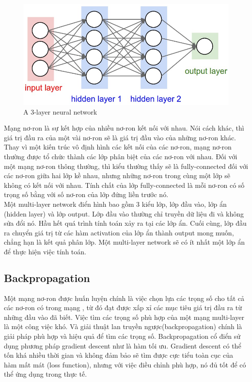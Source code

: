\begin{center}
    \begin{figure}[htp]
    \begin{center}
     \includegraphics[scale=.4]{image/neural_net2}
    \end{center}
    \caption{A 3-layer neural network}
    \label{fig:multilayer}
    \end{figure}
\end{center}

Mạng nơ-ron là sự kết hợp của nhiều nơ-ron kết nối với nhau. Nói cách khác, thì giá trị đầu ra của một vài nơ-ron sẽ là giá trị đầu vào của những nơ-ron khác. Thay vì một kiến trúc vô định hình các kết nối của các nơ-ron, mạng nơ-ron thường được tổ chức thành các lớp phân biệt của các nơ-ron với nhau. Đối với một mạng nơ-ron thông thường, thì kiểu thường thấy sẽ là fully-connected đối với các nơ-ron giữa hai lớp kề nhau, nhưng những nơ-ron trong cùng một lớp sẽ không có kết nối với nhau. Tính chất của lớp fully-connected là mỗi nơ-ron có số trọng số bằng với số nơ-ron của lớp đứng liền trước nó.\\

Một multi-layer network điển hình bao gồm 3 kiểu lớp, lớp đầu vào, lớp ẩn (hidden layer) và lớp output. Lớp đầu vào thường chỉ truyền dữ liệu đi và không sửa đổi nó. Hầu hết quá trình tính toán xảy ra tại các lớp ẩn. Cuối cùng, lớp đầu ra chuyển giá trị từ các hàm activation của lớp ẩn thành output mong muốn, chẳng hạn là kết quả phân lớp. Một multi-layer network sẽ có ít nhất một lớp ẩn để thực hiện việc tính toán.\\

\subsection{Backpropagation}

Một mạng nơ-ron được huấn luyện chính là việc chọn lựa các trọng số cho tất cả các nơ-ron có trong mạng , từ đó đạt được xấp xỉ các mục tiêu giá trị đầu ra từ những đầu vào đã biết. Việc tìm các trọng số phù hợp của một mạng multi-layer là một công việc khó. Và giải thuật lan truyền ngược(backpropagation) chính là giải pháp phù hợp và hiệu quả để tìm các trọng số. Backpropagation cổ điển sử dụng phương pháp gradient descent như là hàm tối ưu. Gradient descent có thể tốn khá nhiều thời gian và không đảm bảo sẽ tìm được cực tiểu toàn cục của hàm mất mát (loss function), nhưng với việc điều chỉnh phù hợp, nó đủ tốt để có thể ứng dụng trong thực tế.\\

